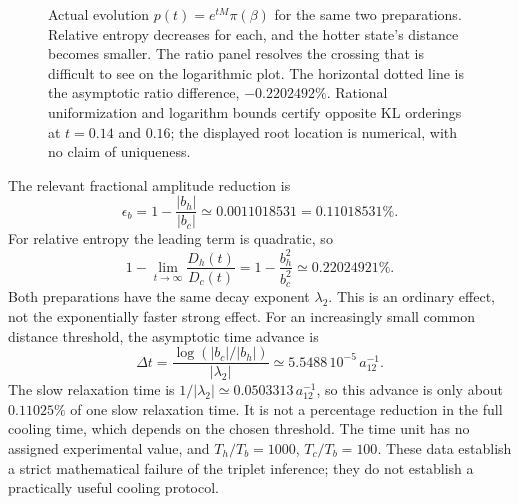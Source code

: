 \documentclass[11pt]{article}
\begin{document}
\begin{figure}[htbp]
\caption{Actual evolution $p(t)=e^{tM}\pi(\beta)$ for the same two preparations. Relative entropy decreases for each, and the hotter state's distance becomes smaller. The ratio panel resolves the crossing that is difficult to see on the logarithmic plot. The horizontal dotted line is the asymptotic ratio difference, $-0.2202492\%$. Rational uniformization and logarithm bounds certify opposite KL orderings at $t=0.14$ and $0.16$; the displayed root location is numerical, with no claim of uniqueness.}
\label{fig:crossing}
\end{figure}


The relevant fractional amplitude reduction is
\[
\epsilon_b=1-\frac{|b_h|}{|b_c|}\simeq0.0011018531=0.11018531\%.
\]
For relative entropy the leading term is quadratic, so
\[
1-\lim_{t\to\infty}\frac{D_h(t)}{D_c(t)}
=1-\frac{b_h^2}{b_c^2}\simeq0.22024921\%.
\]
Both preparations have the same decay exponent $\lambda_2$. This is an ordinary effect, not the exponentially faster strong effect. For an increasingly small common distance threshold, the asymptotic time advance is
\[
\Delta t=\frac{\log(|b_c|/|b_h|)}{|\lambda_2|}
\simeq5.5488\,10^{-5}\,a_{12}^{-1}.
\]
The slow relaxation time is $1/|\lambda_2|\simeq0.0503313\,a_{12}^{-1}$, so this advance is only about $0.11025\%$ of one slow relaxation time. It is not a percentage reduction in the full cooling time, which depends on the chosen threshold. The time unit has no assigned experimental value, and $T_h/T_b=1000$, $T_c/T_b=100$. These data establish a strict mathematical failure of the triplet inference; they do not establish a practically useful cooling protocol.
\end{document}

